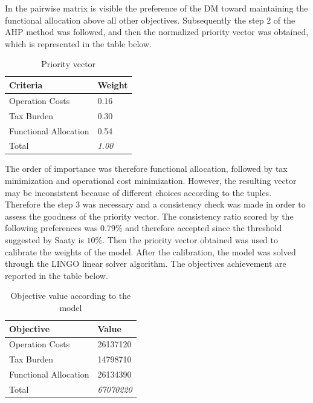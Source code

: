 \begin{doublespace}
In the pairwise matrix is visible the preference of the DM toward maintaining the functional allocation above all other objectives. Subsequently the step 2 of the AHP method was followed, and then the normalized priority vector was obtained, which is represented in the table below.

\begin{table}[]
\centering
\begin{tabular}{@{}ll@{}}
\toprule
\textbf{Criteria}     & Weight        \\ \midrule
Operation Costs       & 0.16          \\
Tax Burden            & 0.30          \\
Functional Allocation & 0.54          \\
Total                 & \textit{1.00} \\ \bottomrule
\end{tabular}
\caption{Priority vector}
\end{table}

The order of importance was therefore functional allocation, followed by tax minimization and operational cost minimization. However, the resulting vector may be inconsistent because of different choices according to the tuples. Therefore the step 3 was necessary and a consistency check was made in order to assess the goodness of the priority vector.
The consistency ratio scored by the following preferences was $0.79\%$ and therefore accepted since the threshold suggested by Saaty\cite{Saaty1980} is $10\%$. Then the priority vector obtained was used to calibrate the weights of the model. After the calibration, the model was solved through the LINGO linear solver algorithm. The objectives achievement are reported in the table below.

\begin{table}[]
\centering
\begin{tabular}{@{}ll@{}}
\toprule
\textbf{Objective}    & Value         \\ \midrule
Operation Costs       & 26137120     \\
Tax Burden	      & 14798710     \\
Functional Allocation & 26134390     \\
Total                 & \textit{67070220} \\ \bottomrule
\end{tabular}
\caption{Objective value according to the model}
\end{table}


\end{doublespace}
